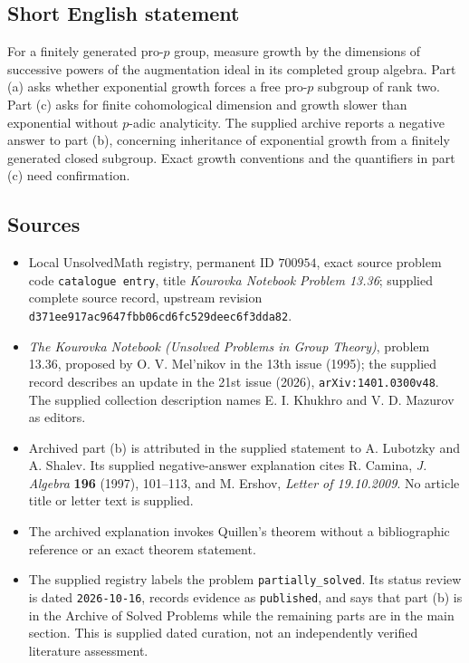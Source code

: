 \documentclass[11pt]{article}
\begin{document}
\subsection{Short English statement}
For a finitely generated pro-\(p\) group, measure growth by the dimensions of successive powers of the augmentation ideal in its completed group algebra. Part (a) asks whether exponential growth forces a free pro-\(p\) subgroup of rank two. Part (c) asks for finite cohomological dimension and growth slower than exponential without \(p\)-adic analyticity. The supplied archive reports a negative answer to part (b), concerning inheritance of exponential growth from a finitely generated closed subgroup. Exact growth conventions and the quantifiers in part (c) need confirmation.
\subsection{Sources}
\begin{itemize}
\item Local UnsolvedMath registry, permanent ID \(700954\), exact source problem code \texttt{catalogue entry}, title \emph{Kourovka Notebook Problem 13.36}; supplied complete source record, upstream revision \texttt{d371ee917ac9647fbb06cd6fc529deec6f3dda82}.
\item \emph{The Kourovka Notebook (Unsolved Problems in Group Theory)}, problem 13.36, proposed by O. V. Mel'nikov in the 13th issue (1995); the supplied record describes an update in the 21st issue (2026), \texttt{arXiv:1401.0300v48}. The supplied collection description names E. I. Khukhro and V. D. Mazurov as editors.
\item Archived part (b) is attributed in the supplied statement to A. Lubotzky and A. Shalev. Its supplied negative-answer explanation cites R. Camina, \emph{J. Algebra} \textbf{196} (1997), 101--113, and M. Ershov, \emph{Letter of 19.10.2009}. No article title or letter text is supplied.
\item The archived explanation invokes Quillen's theorem without a bibliographic reference or an exact theorem statement.
\item The supplied registry labels the problem \texttt{partially\_solved}. Its status review is dated \texttt{2026-10-16}, records evidence as \texttt{published}, and says that part (b) is in the Archive of Solved Problems while the remaining parts are in the main section. This is supplied dated curation, not an independently verified literature assessment.
\end{itemize}
\end{document}
